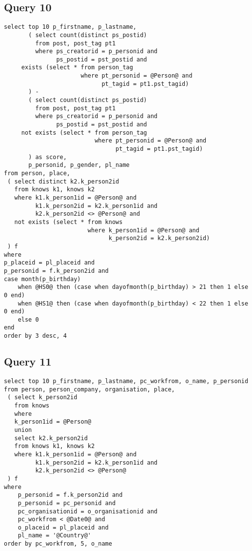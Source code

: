 \subsection{Query 10}
\begin{verbatim}
select top 10 p_firstname, p_lastname,
       ( select count(distinct ps_postid)
         from post, post_tag pt1
         where ps_creatorid = p_personid and
               ps_postid = pst_postid and
     exists (select * from person_tag
                      where pt_personid = @Person@ and 
                            pt_tagid = pt1.pst_tagid)
       ) -
       ( select count(distinct ps_postid)
         from post, post_tag pt1
         where ps_creatorid = p_personid and 
               ps_postid = pst_postid and
     not exists (select * from person_tag 
                          where pt_personid = @Person@ and 
                                pt_tagid = pt1.pst_tagid)
       ) as score,
       p_personid, p_gender, pl_name
from person, place,
 ( select distinct k2.k_person2id
   from knows k1, knows k2
   where k1.k_person1id = @Person@ and 
         k1.k_person2id = k2.k_person1id and 
         k2.k_person2id <> @Person@ and
   not exists (select * from knows 
                        where k_person1id = @Person@ and 
                              k_person2id = k2.k_person2id)
 ) f
where
p_placeid = pl_placeid and
p_personid = f.k_person2id and
case month(p_birthday) 
    when @HS0@ then (case when dayofmonth(p_birthday) > 21 then 1 else 0 end)
    when @HS1@ then (case when dayofmonth(p_birthday) < 22 then 1 else 0 end)
    else 0
end
order by 3 desc, 4
\end{verbatim}


 

\subsection{Query 11}
\begin{verbatim}
select top 10 p_firstname, p_lastname, pc_workfrom, o_name, p_personid
from person, person_company, organisation, place,
 ( select k_person2id
   from knows
   where
   k_person1id = @Person@
   union
   select k2.k_person2id
   from knows k1, knows k2
   where k1.k_person1id = @Person@ and 
         k1.k_person2id = k2.k_person1id and 
         k2.k_person2id <> @Person@
 ) f
where
    p_personid = f.k_person2id and
    p_personid = pc_personid and
    pc_organisationid = o_organisationid and
    pc_workfrom < @Date0@ and
    o_placeid = pl_placeid and
    pl_name = '@Country@'
order by pc_workfrom, 5, o_name
\end{verbatim}



